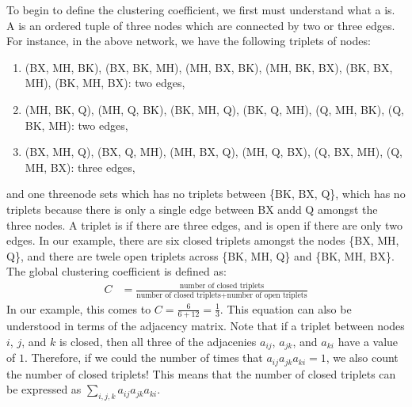 \documentclass[letterpaper,10pt,english]{jupyterBook}
\begin{document}
\noindent{}

\sphinxAtStartPar
To begin to define the clustering coefficient, we first must understand what a  is. A  is an ordered tuple of three nodes which are connected by two or three edges. For instance, in the above network, we have the following triplets of nodes:
\begin{enumerate}
%
\item {} 
\sphinxAtStartPar
(BX, MH, BK), (BX, BK, MH), (MH, BX, BK), (MH, BK, BX), (BK, BX, MH), (BK, MH, BX): two edges,

\item {} 
\sphinxAtStartPar
(MH, BK, Q), (MH, Q, BK), (BK, MH, Q), (BK, Q, MH), (Q, MH, BK), (Q, BK, MH): two edges,

\item {} 
\sphinxAtStartPar
(BX, MH, Q), (BX, Q, MH), (MH, BX, Q), (MH, Q, BX), (Q, BX, MH), (Q, MH, BX): three edges,

\end{enumerate}

\sphinxAtStartPar
and one three\sphinxhyphen{}node sets which has no triplets between \{BK, BX, Q\}, which has no triplets because there is only a single edge between BX andd Q amongst the three nodes. A triplet is  if there are three edges, and is open if there are only two edges. In our example, there are six closed triplets amongst the nodes \{BX, MH, Q\}, and there are twele open triplets across \{BK, MH, Q\} and \{BK, MH, BX\}. The global clustering coefficient is defined as:
\begin{align*}
    C &= \frac{\text{number of closed triplets}}{\text{number of closed triplets} + \text{number of open triplets}}
\end{align*}
\sphinxAtStartPar
In our example, this comes to \(C = \frac{6}{6 + 12} = \frac{1}{3}\). This equation can also be understood in terms of the adjacency matrix. Note that if a triplet between nodes \(i\), \(j\), and \(k\) is closed, then all three of the adjacenies \(a_{ij}\), \(a_{jk}\), and \(a_{ki}\) have a value of \(1\). Therefore, if we could the number of times that \(a_{ij}a_{jk}a_{ki} = 1\), we also count the number of closed triplets! This means that the number of closed triplets can be expressed as \(\sum_{i,j,k}a_{ij}a_{jk}a_{ki}\).
\end{document}
